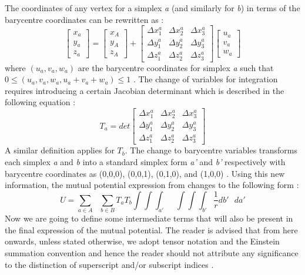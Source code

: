 %
The coordinates of any vertex for a simplex \textit{a} (and similarly for \textit{b}) in terms of the barycentre coordinates can be rewritten as \cite{werner_poly}:
\begin{equation}
\begin{bmatrix}
x_a\\
y_a\\
z_a
\end{bmatrix}
=
\begin{bmatrix}
x_A\\
y_A\\
z_A
\end{bmatrix}
+
\begin{bmatrix}
\Delta x_1^a & \Delta x_2^a	& \Delta x_3^a\\
\Delta y_1^a & \Delta y_2^a	& \Delta y_3^a\\
\Delta z_1^a & \Delta z_2^a	& \Delta z_3^a
\end{bmatrix}
\begin{bmatrix}
u_a\\
v_a\\
w_a
\end{bmatrix}
\end{equation}
%
where $(u_a, v_a, w_a)$ are the barycentre coordinates for simplex \textit{a} such that $0 \leq (u_a,v_a,w_a, u_a+v_a+w_a) \leq 1$ \cite{werner_poly}. The change of variables for integration requires introducing a certain Jacobian determinant which is described in the following equation \cite{werner_poly}:
\begin{equation}
\label{Tmatrix}
T_a
=
det
\begin{bmatrix}
\Delta x_1^a & \Delta x_2^a	& \Delta x_3^a\\
\Delta y_1^a & \Delta y_2^a	& \Delta y_3^a\\
\Delta z_1^a & \Delta z_2^a	& \Delta z_3^a
\end{bmatrix}
\end{equation}
%
A similar definition applies for $T_b$. The change to barycentre variables transforms each simplex \textit{a} and \textit{b} into a standard simplex form \textit{a'} and \textit{b'} respectively with barycentre coordinates as (0,0,0), (0,0,1), (0,1,0), and (1,0,0) \cite{werner_poly}. Using this new information, the mutual potential expression from  changes to the following form \cite{werner_poly}:
\begin{equation}
\label{u_def3}
U = \sum_{a\in A} \text{ } \sum_{b\in B} T_aT_b \int \int \int_{a'} \text{ } \int \int \int_{b'} \frac{1}{r} db' \text{ } da'
\end{equation}
%
Now we are going to define some intermediate terms that will also be present in the final expression of the mutual potential. The reader is advised that from here onwards, unless stated otherwise, we adopt tensor notation and the Einstein summation convention and hence the reader should not attribute any significance to the distinction of superscript and/or subscript indices \cite{werner_poly}.


